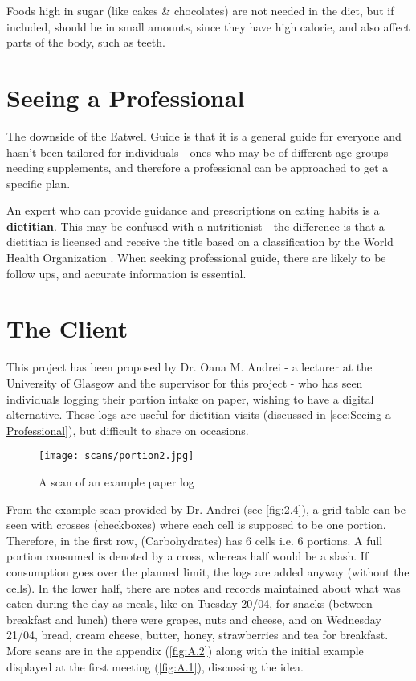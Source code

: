 \documentclass[../main.tex]{subfiles}
\begin{document}

Foods high in sugar (like cakes \& chocolates) are not needed in the diet, but if included, should be in small amounts, since they have high calorie, and also affect parts of the body, such as teeth.

\section{Seeing a Professional}

The downside of the Eatwell Guide is that it is a general guide for everyone and hasn't been tailored for individuals - ones who may be of different age groups needing supplements, and therefore a professional can be approached to get a specific plan.

An expert who can provide guidance and prescriptions on eating habits is a \textbf{dietitian}. This may be confused with a nutritionist - the difference is that a dietitian is licensed and receive the title based on a classification by the World Health Organization \cite{whoClassification}. When seeking professional guide, there are likely to be follow ups, and accurate information is essential.

\section{The Client}

This project has been proposed by Dr. Oana M. Andrei - a lecturer at the University of Glasgow and the supervisor for this project - who has seen individuals logging their portion intake on paper, wishing to have a digital alternative. These logs are useful for dietitian visits (discussed in \ref{sec:Seeing a Professional}), but difficult to share on occasions.

\begin{figure}
    \centering
    \texttt{[image: scans/portion2.jpg]}
    \caption{A scan of an example paper log}%
\end{figure}

From the example scan provided by Dr. Andrei (see \ref{fig:2.4}), a grid table can be seen with crosses (checkboxes) where each cell is supposed to be one portion. Therefore, in the first row,  (Carbohydrates) has 6 cells i.e. 6 portions. A full portion consumed is denoted by a cross, whereas half would be a slash. If consumption goes over the planned limit, the logs are added anyway (without the cells). In the lower half, there are notes and records maintained about what was eaten during the day as meals, like on Tuesday 20/04, for snacks (between breakfast and lunch) there were grapes, nuts and cheese, and on Wednesday 21/04, bread, cream cheese, butter, honey, strawberries and tea for breakfast. More scans are in the appendix (\ref{fig:A.2}) along with the initial example displayed at the first meeting (\ref{fig:A.1}), discussing the idea.
\end{document}
